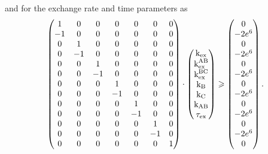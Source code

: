 and for the exchange rate and time parameters as
\begin{equation}
    \begin{pmatrix}
         1 & 0 & 0 & 0 & 0 & 0 & 0 \\
        -1 & 0 & 0 & 0 & 0 & 0 & 0 \\
         0 & 1 & 0 & 0 & 0 & 0 & 0 \\
         0 &-1 & 0 & 0 & 0 & 0 & 0 \\
         0 & 0 & 1 & 0 & 0 & 0 & 0 \\
         0 & 0 &-1 & 0 & 0 & 0 & 0 \\
         0 & 0 & 0 & 1 & 0 & 0 & 0 \\
         0 & 0 & 0 &-1 & 0 & 0 & 0 \\
         0 & 0 & 0 & 0 & 1 & 0 & 0 \\
         0 & 0 & 0 & 0 &-1 & 0 & 0 \\
         0 & 0 & 0 & 0 & 0 & 1 & 0 \\
         0 & 0 & 0 & 0 & 0 &-1 & 0 \\
         0 & 0 & 0 & 0 & 0 & 0 & 1 \\
    \end{pmatrix}
    \cdot
    \begin{pmatrix}
        \textrm{k}_{\textrm{ex}} \\
        \textrm{k}_{\textrm{ex}}^{\textrm{AB}} \\
        \textrm{k}_{\textrm{ex}}^{\textrm{BC}} \\
        \textrm{k}_{\textrm{B}} \\
        \textrm{k}_{\textrm{C}} \\
        \textrm{k}_{\textrm{AB}} \\
        \tau_{\textrm{ex}} \\
    \end{pmatrix}
    \geqslant
    \begin{pmatrix}
        0 \\
        -2e^6 \\
        0 \\
        -2e^6 \\
        0 \\
        -2e^6 \\
        0 \\
        -2e^6 \\
        0 \\
        -2e^6 \\
        0 \\
        -2e^6 \\
        0 \\
    \end{pmatrix}.
\end{equation}

